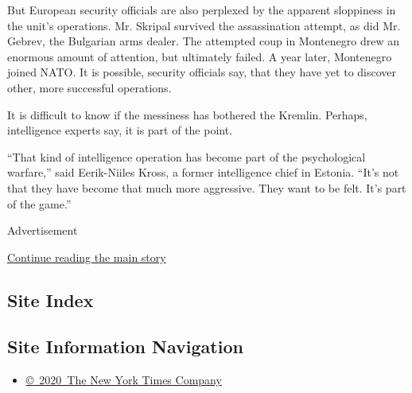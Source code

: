 But European security officials are also perplexed by the apparent
sloppiness in the unit's operations. Mr. Skripal survived the
assassination attempt, as did Mr. Gebrev, the Bulgarian arms dealer. The
attempted coup in Montenegro drew an enormous amount of attention, but
ultimately failed. A year later, Montenegro joined NATO. It is possible,
security officials say, that they have yet to discover other, more
successful operations.

It is difficult to know if the messiness has bothered the Kremlin.
Perhaps, intelligence experts say, it is part of the point.

``That kind of intelligence operation has become part of the
psychological warfare,'' said Eerik-Niiles Kross, a former intelligence
chief in Estonia. ``It's not that they have become that much more
aggressive. They want to be felt. It's part of the game.''

Advertisement

\protect\hyperlink{after-bottom}{Continue reading the main story}

\hypertarget{site-index}{%
\subsection{Site Index}\label{site-index}}

\hypertarget{site-information-navigation}{%
\subsection{Site Information
Navigation}\label{site-information-navigation}}

\begin{itemize}
\tightlist
\item
  \href{https://help.nytimes.com/hc/en-us/articles/115014792127-Copyright-notice}{©~2020~The
  New York Times Company}
\end{itemize}

